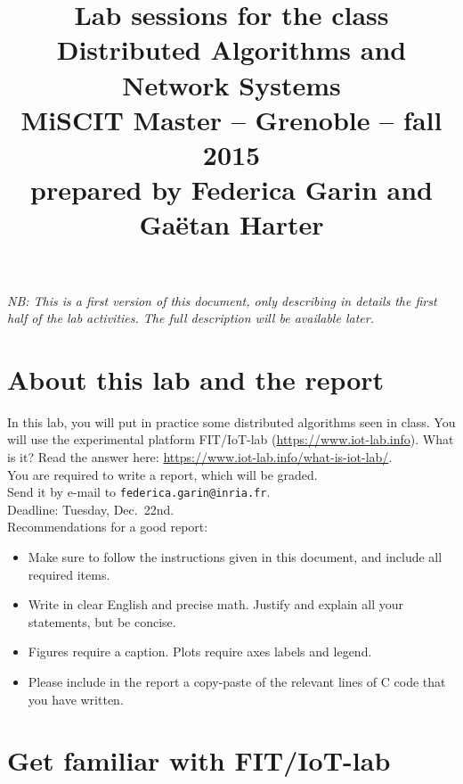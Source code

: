 \documentclass{article}
\begin{document}
\title{
{\normalsize Lab sessions for the class}\\[-1mm]
Distributed Algorithms and Network Systems\\[-2mm]
{\normalsize MiSCIT Master -- Grenoble -- fall 2015}\\[-1mm]
{\normalsize prepared by Federica Garin and Ga\"{e}tan Harter}}
\date{}
\maketitle
\vspace{-2cm}

\textit{NB: This is a first version of this document, only describing in details the first half of the lab activities. The full description will be available later.}


\section{About this lab and the report}
In this lab, you will put in practice some distributed algorithms seen in class.
You will use the experimental platform FIT/IoT-lab (\url{https://www.iot-lab.info}).
What is it? Read the answer here: \url{https://www.iot-lab.info/what-is-iot-lab/}.\\

You are required to write a report, which will be graded.\\ Send it by e-mail to \texttt{federica.garin@inria.fr}.\\
Deadline: Tuesday, Dec.~22nd.\\

Recommendations for a good report:
\begin{itemize}
\item Make sure to follow the instructions given in this document, and include all required items.
\item Write in clear English and precise math. Justify and explain all your statements, but be concise.
\item Figures require a caption. Plots require axes labels and legend.
\item Please include in the report a copy-paste of the relevant lines of C code that you have written.
\end{itemize}


\section{Get familiar with FIT/IoT-lab}
\end{document}
